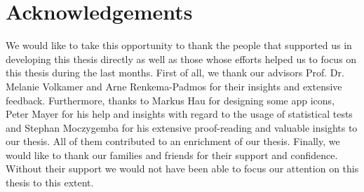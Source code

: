\section*{Acknowledgements}

We would like to take this opportunity to thank the people that supported us in developing this thesis directly as well as those whose efforts helped us to focus on this thesis during the last months. First of all, we thank our advisors Prof. Dr. Melanie Volkamer and Arne Renkema-Padmos for their insights and extensive feedback.
Furthermore, thanks to Markus Hau for designing some app icons, Peter Mayer for his help and insights with regard to the usage of statistical tests and Stephan Moczygemba for his extensive proof-reading and valuable insights to our thesis. All of them contributed to an enrichment of our thesis.
Finally, we would like to thank our families and friends for their support and confidence. Without their support we would not have been able to focus our attention on this thesis to this extent.